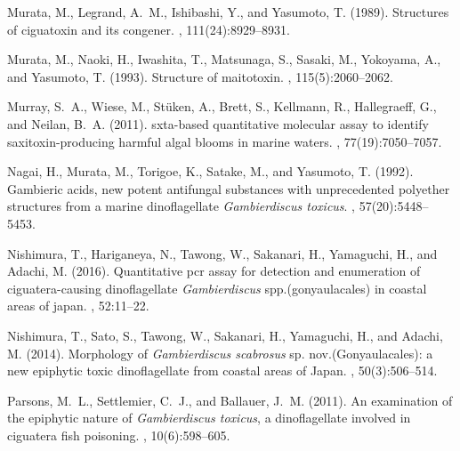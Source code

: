 \documentclass[10pt,letterpaper]{article}
\begin{document}
\begin{thebibliography}{10}
Murata, M., Legrand, A.~M., Ishibashi, Y., and Yasumoto, T. (1989).
\newblock Structures of ciguatoxin and its congener.
, 111(24):8929--8931.

Murata, M., Naoki, H., Iwashita, T., Matsunaga, S., Sasaki, M., Yokoyama, A.,
  and Yasumoto, T. (1993).
\newblock Structure of maitotoxin.
, 115(5):2060--2062.

Murray, S.~A., Wiese, M., St{\"u}ken, A., Brett, S., Kellmann, R., Hallegraeff,
  G., and Neilan, B.~A. (2011).
\newblock sxta-based quantitative molecular assay to identify
  saxitoxin-producing harmful algal blooms in marine waters.
, 77(19):7050--7057.

Nagai, H., Murata, M., Torigoe, K., Satake, M., and Yasumoto, T. (1992).
\newblock Gambieric acids, new potent antifungal substances with unprecedented
  polyether structures from a marine dinoflagellate \emph{Gambierdiscus
  toxicus}.
, 57(20):5448--5453.

Nishimura, T., Hariganeya, N., Tawong, W., Sakanari, H., Yamaguchi, H., and
  Adachi, M. (2016).
\newblock Quantitative pcr assay for detection and enumeration of
  ciguatera-causing dinoflagellate \emph{Gambierdiscus} spp.(gonyaulacales) in
  coastal areas of japan.
, 52:11--22.

Nishimura, T., Sato, S., Tawong, W., Sakanari, H., Yamaguchi, H., and Adachi,
  M. (2014).
\newblock Morphology of \emph{Gambierdiscus scabrosus} sp.
  nov.({G}onyaulacales): a new epiphytic toxic dinoflagellate from coastal
  areas of {J}apan.
, 50(3):506--514.

Parsons, M.~L., Settlemier, C.~J., and Ballauer, J.~M. (2011).
\newblock An examination of the epiphytic nature of \emph{Gambierdiscus
  toxicus}, a dinoflagellate involved in ciguatera fish poisoning.
, 10(6):598--605.


\end{thebibliography}
\end{document}
